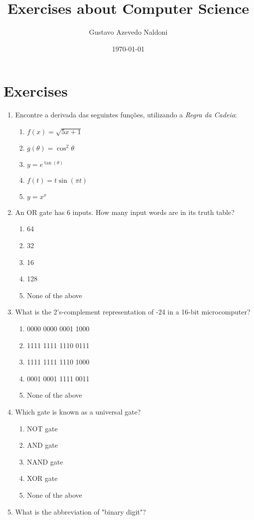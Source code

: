 \documentclass{article}
\title{Exercises about Computer Science}
\author{Gustavo Azevedo Naldoni}
\date{\today}
\begin{document}

\maketitle
\section{Exercises}
\begin{enumerate}
\item Encontre a derivada das seguintes funções, utilizando a \emph{Regra da Cadeia}:

    \begin{enumerate}
        \item $f(x) = \sqrt{5x + 1}$
        \item $g(\theta) = \cos^2 \theta$
        \item $y = e^{\tan (\theta)}$
        \item $f(t) = t \sin (\pi t)$
        \item $y = x^x$
    \end{enumerate}
\item An OR gate has 6 inputs. How many input words are in its truth table?
    
            \begin{enumerate}
                \item 64
                \item 32
                \item 16
                \item 128
                \item None of the above
            \end{enumerate}
\item What is the 2's-complement representation of -24 in a 16-bit microcomputer?
    
            \begin{enumerate}
                \item 0000 0000 0001 1000
                \item 1111 1111 1110 0111
                \item 1111 1111 1110 1000
                \item 0001 0001 1111 0011
                \item None of the above
            \end{enumerate}
\item Which gate is known as a universal gate?
    
            \begin{enumerate}
                \item NOT gate
                \item AND gate
                \item NAND gate
                \item XOR gate
                \item None of the above
            \end{enumerate}
\item What is the abbreviation of "binary digit"?
    

\end{enumerate}
\end{document}
